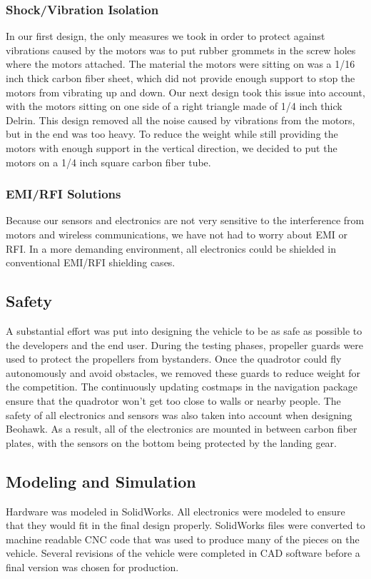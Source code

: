 \documentclass[12pt, letterpaper]{article}
\begin{document}
\subsubsection{Shock/Vibration Isolation}
In our first design, the only measures we took in order to protect against vibrations caused by the motors was to put rubber grommets in the screw holes where the motors attached.  The material the motors were sitting on was a 1/16 inch thick carbon fiber sheet, which did not provide enough support to stop the motors from vibrating up and down. Our next design took this issue into account, with the motors sitting on one side of a right triangle made of 1/4 inch thick Delrin.  This design removed all the noise caused by vibrations from the motors, but in the end was too heavy.  To reduce the weight while still providing the motors with enough support in the vertical direction, we decided to put the motors on a 1/4 inch square carbon fiber tube.

\subsubsection{EMI/RFI Solutions}
Because our sensors and electronics are not very sensitive to the interference from motors and wireless communications, we have not had to worry about EMI or RFI. In a more demanding environment, all electronics could be shielded in conventional EMI/RFI shielding cases.

\subsection{Safety}
A substantial effort was put into designing the vehicle to be as safe as possible to the developers and the end user. During the testing phases, propeller guards were used to protect the propellers from bystanders.  Once the quadrotor could fly autonomously and avoid obstacles, we removed these guards to reduce weight for the competition. The continuously updating costmaps in the navigation package ensure that the quadrotor won't get too close to walls or nearby people.  The safety of all electronics and sensors was also taken into account when designing Beohawk.  As a result, all of the electronics are mounted in between carbon fiber plates, with the sensors on the bottom being protected by the landing gear.

\subsection{Modeling and Simulation}
Hardware was modeled in SolidWorks. All electronics were modeled to ensure that they would fit in the final design properly. SolidWorks files were converted to machine readable CNC code that was used to produce many of the pieces on the vehicle. Several revisions of the vehicle were completed in CAD software before a final version was chosen for production.
\end{document}
